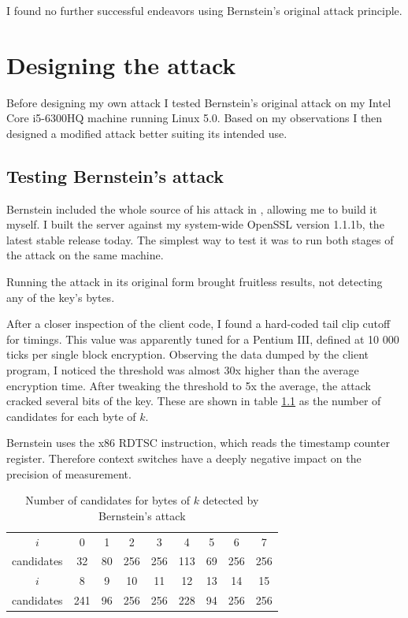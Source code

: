 \documentclass[thesis=B,english]{FITthesis}[2019/03/06]
\begin{document}
I found no further successful endeavors using Bernstein's original attack principle.

\chapter{Designing the attack}
Before designing my own attack I tested Bernstein's original attack on my Intel Core i5-6300HQ machine running Linux 5.0.
Based on my observations I then designed a modified attack better suiting its intended use.

\section{Testing Bernstein's attack}
Bernstein included the whole source of his attack in \cite{bernstein2005cache}, allowing me to build it myself.
I built the server against my system-wide OpenSSL version 1.1.1b, the latest stable release today.
The simplest way to test it was to run both stages of the attack on the same machine.

Running the attack in its original form brought fruitless results, not detecting any of the key's bytes.

After a closer inspection of the client code, I found a hard-coded tail clip cutoff for timings.
This value was apparently tuned for a Pentium III, defined at 10 000 ticks per single block encryption.
Observing the data dumped by the client program, I noticed the threshold was almost 30x higher than the average encryption time.
After tweaking the threshold to 5x the average, the attack cracked several bits of the key.
These are shown in table \ref{tbl:bernstein_result} as the number of candidates for each byte of $k$.

Bernstein uses the x86 RDTSC instruction, which reads the timestamp counter register.
Therefore context switches have a deeply negative impact on the precision of measurement.

\begin{table}
	\centering
	\begin{tabular}{c|c c c c c c c c}
		$i$ & 0 & 1 & 2 & 3 & 4 & 5 & 6 & 7 \\
		candidates & 32 & 80 & 256 & 256 & 113 & 69 & 256 & 256 \\
		\hline
		$i$ & 8 & 9 & 10 & 11 & 12 & 13 & 14 & 15 \\
		candidates & 241 & 96 & 256 & 256 & 228 & 94 & 256 & 256
	\end{tabular}
	\caption{Number of candidates for bytes of $k$ detected by Bernstein's attack}
	\label{tbl:bernstein_result}
\end{table}
\end{document}
